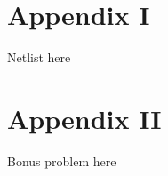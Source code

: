 \documentclass[12pt,english]{article}
\begin{document}

\section{Appendix I}
Netlist here

\pagebreak



\section{Appendix II}
Bonus problem here
\end{document}
